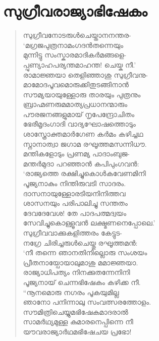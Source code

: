 
\section{സുഗ്രീവരാജ്യാഭിഷേകം}

\begin{verse}
സുഗ്രീവനോടരുള്‍ചെയ്താനനന്തര-\\
‘മഗ്രജപുത്രനാമംഗദന്‍തന്നെയും\\
മുന്നിട്ടു സംസ്കാരമാദികര്‍മങ്ങളെ-\\
പ്പുണ്യാഹപര്യന്തമാഹന്ത! ചെയ്ക നീ.’\\
രാമാജ്ഞയാ തെളിഞ്ഞാശു സുഗ്രീവനു-\\
മാമോദപൂവമൊരുക്കിതുടങ്ങിനാന്‍\\
സൗമ്യയായുള്ളോരു താരയും പുത്രനും\\
ബ്രാഹ്മണരുമമാത്യപ്രധാനന്മാരും\\
പൗരജനങ്ങളുമായ് നൃപേന്ദ്രോചിതം\\
ഭേരീമൃദംഗാദി വാദ്യഘോഷത്തൊടും\\
ശാസ്ത്രോക്തമാര്‍ഗേണ കര്‍മം കഴിച്ചഥ\\
സ്നാനാത്വാ ജഗാമ രഘൂത്തമസന്നിധൗ.\\
മന്തികളോടും പ്രണമ്യ പാദാംബുജ-\\
മന്തര്‍മുദാ പറഞ്ഞാന്‍ കപിപുംഗവന്‍:\\
‘രാജ്യത്തെ രക്ഷിച്ചുകൊള്‍കവേണമിനി\\
പൂജ്യനാകും നിന്തിരുവടി സാദരം.\\
ദാസനായുള്ളോരടിയനിനിത്തവ\\
ശാസനയും പരിപാലിച്ചു സന്തതം\\
ദേവദേവേശ! തേ പാദപത്മദ്വയം\\
സേവിച്ചുകൊള്ളൂവന്‍ ലക്ഷ്മണനെപ്പോലെ.’\\
സുഗ്രീവവാക്കുകളിത്തരം കേട്ടുട-\\
നഗ്രേ ചിരിച്ചരുള്‍ചെയ്തു രഘൂത്തമന്‍:\\
‘നീ തന്നെ ഞാനതിനില്ലൊരു സംശയം\\
പ്രീതനായ്പോയാലുമാശു മമാജ്ഞയാ.\\
രാജ്യാധിപത്യം നിനക്കുതന്നേനിനി\\
പൂജ്യനായ് ചെന്നഭിഷേകം കഴിക്ക നീ.\\
“നൂനമൊരു നഗരം പൂകയുമില്ല\\
ഞാനോ പനിന്നാലു സംവത്സരത്തോളം.\\
സൗമിത്രിചെയ്യുമഭിഷേകമാദരാല്‍\\
സാമര്‍ഥ്യമുള്ള കുമാരനെപ്പിന്നെ നീ\\
യൗവരാജ്യാര്‍ഥമഭിഷേചയ പ്രഭോ!\\

\end{verse}
